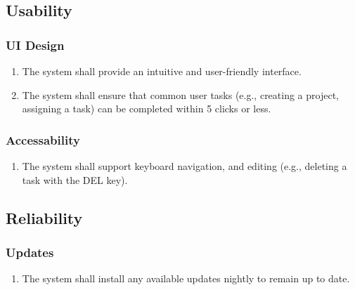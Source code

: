 \documentclass[]{article}
\begin{document}
        \subsection{Usability}
            \subsubsection{UI Design}
            \begin{enumerate}[label=\scriptsize\textbf{\textcolor{gray}{NFR-USAB-\arabic{usabilityCounter}}}, leftmargin=*, itemsep=-4px]
                \item The system shall provide an intuitive and user-friendly interface.
                \item The system shall ensure that common user tasks (e.g., creating a project, assigning a task) can be completed within 5 clicks or less.
            \end{enumerate}

            \subsubsection{Accessability}
            \begin{enumerate}[label=\scriptsize\textbf{\textcolor{gray}{NFR-USAB-\arabic{usabilityCounter}}}, leftmargin=*, itemsep=-4px]
                \item The system shall support keyboard navigation, and editing (e.g., deleting a task with the DEL key).
            \end{enumerate}

         \subsection{Reliability}
            \subsubsection{Updates}
            \begin{enumerate}[label=\scriptsize\textbf{\textcolor{gray}{NFR-RELI-\arabic{reliabilityCounter}}}, leftmargin=*, itemsep=-4px]
                \item The system shall install any available updates nightly to remain up to date.
            \end{enumerate}
\end{document}
